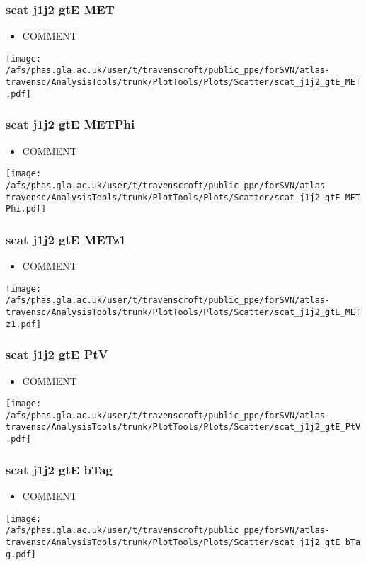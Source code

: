\documentclass{beamer}
\begin{document}
\begin{frame}
\frametitle{scat j1j2 gtE MET}
\begin{itemize}
\item COMMENT
\end{itemize}
\begin{center}
\texttt{[image: /afs/phas.gla.ac.uk/user/t/travenscroft/public\_ppe/forSVN/atlas-travensc/AnalysisTools/trunk/PlotTools/Plots/Scatter/scat\_j1j2\_gtE\_MET.pdf]}
\end{center}
\end{frame}

\begin{frame}
\frametitle{scat j1j2 gtE METPhi}
\begin{itemize}
\item COMMENT
\end{itemize}
\begin{center}
\texttt{[image: /afs/phas.gla.ac.uk/user/t/travenscroft/public\_ppe/forSVN/atlas-travensc/AnalysisTools/trunk/PlotTools/Plots/Scatter/scat\_j1j2\_gtE\_METPhi.pdf]}
\end{center}
\end{frame}

\begin{frame}
\frametitle{scat j1j2 gtE METz1}
\begin{itemize}
\item COMMENT
\end{itemize}
\begin{center}
\texttt{[image: /afs/phas.gla.ac.uk/user/t/travenscroft/public\_ppe/forSVN/atlas-travensc/AnalysisTools/trunk/PlotTools/Plots/Scatter/scat\_j1j2\_gtE\_METz1.pdf]}
\end{center}
\end{frame}

\begin{frame}
\frametitle{scat j1j2 gtE PtV}
\begin{itemize}
\item COMMENT
\end{itemize}
\begin{center}
\texttt{[image: /afs/phas.gla.ac.uk/user/t/travenscroft/public\_ppe/forSVN/atlas-travensc/AnalysisTools/trunk/PlotTools/Plots/Scatter/scat\_j1j2\_gtE\_PtV.pdf]}
\end{center}
\end{frame}

\begin{frame}
\frametitle{scat j1j2 gtE bTag}
\begin{itemize}
\item COMMENT
\end{itemize}
\begin{center}
\texttt{[image: /afs/phas.gla.ac.uk/user/t/travenscroft/public\_ppe/forSVN/atlas-travensc/AnalysisTools/trunk/PlotTools/Plots/Scatter/scat\_j1j2\_gtE\_bTag.pdf]}
\end{center}
\end{frame}
\end{document}

